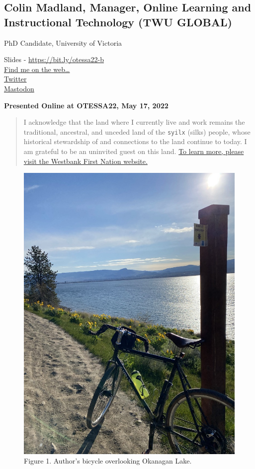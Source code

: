 \documentclass[
]{book}
\begin{document}
\hypertarget{colin-madland-manager-online-learning-and-instructional-technology-twu-global}{%
\subsection*{Colin Madland, Manager, Online Learning and Instructional Technology (TWU GLOBAL)}\label{colin-madland-manager-online-learning-and-instructional-technology-twu-global}}

PhD Candidate, University of Victoria

Slides - \url{https://bit.ly/otessa22-b}\\
\href{https://cmad.land}{Find me on the web\ldots{}}\\
\href{https://twitter.com/colinmadland}{Twitter}\\
\href{https://scholar.social/web/@Cmadland}{Mastodon}

\textbf{Presented Online at OTESSA22, May 17, 2022}

\begin{quote}
I acknowledge that the land where I currently live and work remains the traditional, ancestral, and unceded land of the \texttt{syilx} (silks) people, whose historical stewardship of and connections to the land continue to today. I am grateful to be an uninvited guest on this land. \href{https://wfn.ca}{To learn more, please visit the Westbank First Nation website.}
\end{quote}

\begin{figure}
\centering
\includegraphics{assets/otessa22/kalamoir.jpg}
\caption{Figure 1. Author's bicycle overlooking Okanagan Lake.}
\end{figure}

  
\end{document}
